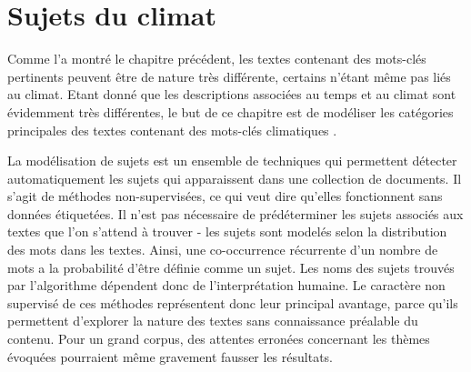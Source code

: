 \documentclass[a4paper,twoside,12pt]{article}
\begin{document}
\clearpage


\section{Sujets du climat} \label{topic_modeling}

Comme l'a montré le chapitre précédent, les textes contenant des mots-clés pertinents peuvent être de nature très différente, certains n'étant même pas liés au climat. Etant donné que les descriptions associées au temps et au climat sont évidemment très différentes, le but de ce chapitre est de modéliser les catégories principales des textes contenant des mots-clés \og climatiques \fg{}.

La modélisation de sujets est un ensemble de techniques qui permettent détecter automatiquement les \og sujets \fg{} qui apparaissent dans une collection de documents. Il s'agit de méthodes non-supervisées, ce qui veut dire qu'elles fonctionnent sans données étiquetées. Il n'est pas nécessaire de prédéterminer les sujets associés aux textes que l'on s'attend à trouver - les sujets sont modelés selon la distribution des mots dans les textes. Ainsi, une co-occurrence récurrente d'un nombre de mots a la probabilité d'être définie comme un sujet. Les noms des sujets trouvés par l'algorithme dépendent donc de l'interprétation humaine. Le caractère non supervisé de ces méthodes représentent donc leur principal avantage, parce qu'ils permettent d'explorer la nature des textes sans connaissance préalable du contenu. Pour un grand corpus, des attentes erronées concernant les thèmes évoquées pourraient même gravement fausser les résultats.
\end{document}
